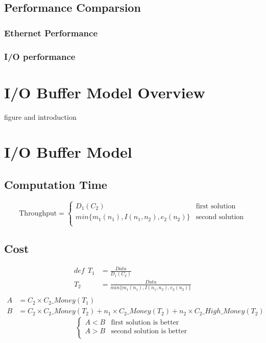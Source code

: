 \documentclass{article}
\begin{document}
	\subsection{Performance Comparsion}
		\subsubsection{Ethernet Performance}
		\subsubsection{I/O performance}


\section{I/O Buffer Model Overview}
figure and introduction


\section{I/O Buffer Model}
	\subsection{Computation Time}
		\begin{equation*}
			\text{Throughput}=
			\begin{cases}
				D_1(C_2) & \text{first solution}\\
				min\{m_1(n_1),I(n_1,n_2),e_2(n_2)\} & \text{second solution}\\
			\end{cases}
		\end{equation*}
	\subsection{Cost}
		\begin{align*}
			def\ \ T_1&=\frac{Data}{D_1(C_2)}\\ T_2&=\frac{Data}{min\{m_1(n_1),I(n_1,n_2),e_2(n_2)\}}\\
		\end{align*}
		\begin{align*}
			A&=C_2\times C_2\_Money(T_1)\\
			B&=C_2\times C_2\_Money(T_2)+n_1\times C_2\_Money(T_2)+n_2\times C_2\_High\_Money(T_2)
		\end{align*}
		\begin{equation*}
			\begin{cases}
				A<B & \text{first solution is better}\\
				A>B & \text{second solution is better}\\
			\end{cases}
		\end{equation*}
\end{document}
